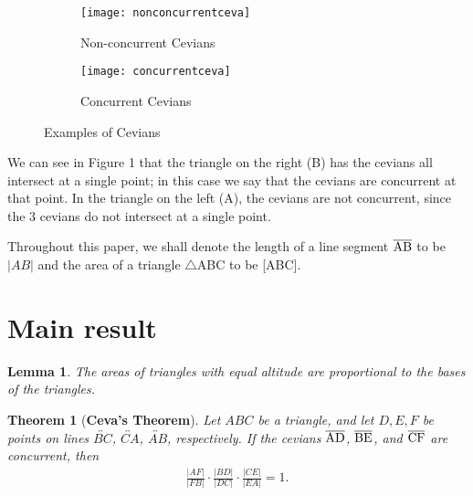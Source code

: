 \documentclass[12pt,a4paper,reqno,parskip=full]{amsart}
\numberwithin{equation}{section}
\theoremstyle{plain}
\newtheorem{theorem}[subsection]{Theorem}
\newtheorem{lemma}[subsection]{Lemma}
\theoremstyle{definition}
\begin{document}
\begin{figure}[H]
     \centering
     \begin{subfigure}[b]{0.3\textwidth}
         \centering
         \texttt{[image: nonconcurrentceva]}
         \caption{Non-concurrent Cevians}
         \label{fig:y equals x}
     \end{subfigure}
     \hspace{2cm}
     \begin{subfigure}[b]{0.295\textwidth}
         \centering
         \texttt{[image: concurrentceva]}
         \caption{Concurrent Cevians}
         \label{fig:three sin x}
     \end{subfigure}
        \caption{Examples of Cevians}
        \label{fig:cevians}
\end{figure}

We can see in Figure 1 that the triangle on the right (B) has the cevians all intersect at a single point; in this case we say that the cevians are concurrent at that point. In the triangle on the left (A), the cevians are not concurrent, since the 3 cevians do not intersect at a single point.


Throughout this paper, we shall denote the length of a line segment $\overline{\rm AB}$ to be $|AB|$ and the area of a triangle $\triangle$ABC to be [ABC].

\section{Main result}

\begin{lemma} The areas of triangles with equal altitude are proportional to the bases of the triangles.
\end{lemma}
\begin{theorem} [\textbf{Ceva's Theorem}]
Let $ABC$ be a triangle, and let $D, E, F$ be points on lines $\overleftrightarrow{BC}$, $\overleftrightarrow{CA}$, $\overleftrightarrow{AB}$, respectively. If the cevians $\overline{\rm AD}$, $\overline{\rm BE}$, and $\overline{\rm CF}$ are concurrent, then
\begin{align*}
\frac{|AF|}{|FB|}\cdot\frac{|BD|}{|DC|}\cdot\frac{|CE|}{|EA|} = 1.
\end{align*}
\end{theorem}
\end{document}
